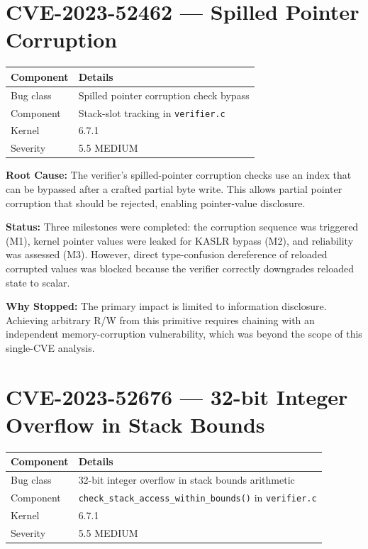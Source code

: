 \section{CVE-2023-52462 — Spilled Pointer Corruption}

\begin{table}[H]
\centering
\begin{tabular}{@{}ll@{}}
\toprule
\textbf{Component} & \textbf{Details} \\
\midrule
Bug class & Spilled pointer corruption check bypass \\
Component & Stack-slot tracking in \texttt{verifier.c} \\
Kernel & 6.7.1 \\
Severity & 5.5 MEDIUM \\
\bottomrule
\end{tabular}
\end{table}

\textbf{Root Cause:} The verifier's spilled-pointer corruption checks use an index that can be bypassed after a crafted partial byte write. This allows partial pointer corruption that should be rejected, enabling pointer-value disclosure.

\textbf{Status:} Three milestones were completed: the corruption sequence was triggered (M1), kernel pointer values were leaked for KASLR bypass (M2), and reliability was assessed (M3). However, direct type-confusion dereference of reloaded corrupted values was blocked because the verifier correctly downgrades reloaded state to scalar.

\textbf{Why Stopped:} The primary impact is limited to information disclosure. Achieving arbitrary R/W from this primitive requires chaining with an independent memory-corruption vulnerability, which was beyond the scope of this single-CVE analysis.


\section{CVE-2023-52676 — 32-bit Integer Overflow in Stack Bounds}

\begin{table}[H]
\centering
\begin{tabular}{@{}ll@{}}
\toprule
\textbf{Component} & \textbf{Details} \\
\midrule
Bug class & 32-bit integer overflow in stack bounds arithmetic \\
Component & \texttt{check\_stack\_access\_within\_bounds()} in \texttt{verifier.c} \\
Kernel & 6.7.1 \\
Severity & 5.5 MEDIUM \\
\bottomrule
\end{tabular}
\end{table}

